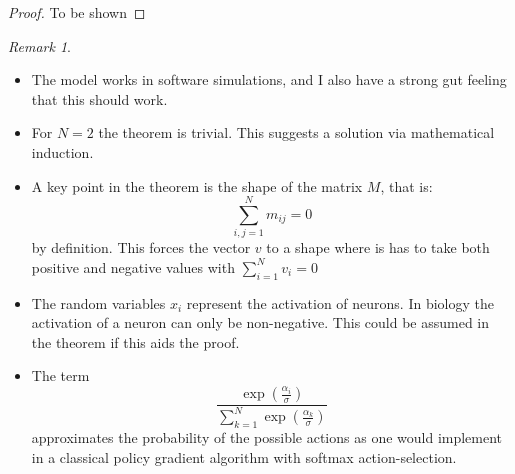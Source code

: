 \documentclass{article}
\theoremstyle{remark}
\newtheorem*{remark}{Remark}
\begin{document}
\begin{proof}
    To be shown
\end{proof}

\begin{remark}
    \begin{itemize}
        \item
            The model works in software simulations, and I also have a strong gut feeling that this should work.
        \item
            For $N=2$ the theorem is trivial. This suggests a solution via mathematical induction.
        \item
            A key point in the theorem is the shape of the matrix $M$, that is:
                \begin{equation}
                    \sum_{i,j=1}^{N} m_{ij}= 0
                \end{equation}
            by definition. This forces the vector $v$ to a shape where is has to take both positive and negative values with $\sum_{i=1}^{N} v_i = 0$
        \item
            The random variables $x_i$ represent the activation of neurons.
            In biology the activation of a neuron can only be non-negative.
            This could be assumed in the theorem if this aids the proof.
        \item
            The term
                \begin{equation}
                    \frac{\exp(\frac{\alpha_i}{\sigma})}{\sum_{k=1}^{N}\exp(\frac{\alpha_k}{\sigma})}
                \end{equation}
            approximates the probability of the possible actions as one would implement in a classical policy gradient algorithm with softmax action-selection.
    \end{itemize}
\end{remark}
\end{document}
